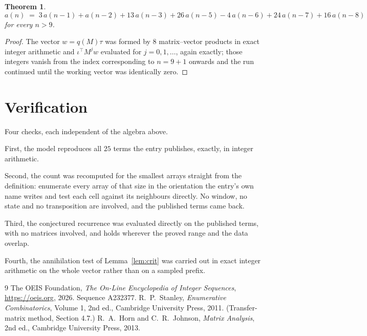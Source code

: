 \documentclass[11pt,a4paper]{article}
\theoremstyle{plain}
\newtheorem{theorem}{Theorem}
\theoremstyle{definition}
\begin{document}
\begin{theorem}
\[
a(n)\;=\;3\,a(n-1) + a(n-2) + 13\,a(n-3) + 26\,a(n-5) - 4\,a(n-6) + 24\,a(n-7) + 16\,a(n-8)
\]
for every $n>9$.
\end{theorem}

\begin{proof}
The vector $w=q(M)\tau$ was formed by $8$ matrix--vector products in exact integer
arithmetic and $\iota^{\!\top}M^{j}w$ evaluated for $j=0,1,\dots$, again exactly; those
integers vanish from the index corresponding to $n=9+1$ onwards and the run continued
until the working vector was identically zero.
\end{proof}

\section{Verification}

Four checks, each independent of the algebra above.

First, the model reproduces all $25$ terms the entry publishes, exactly, in integer
arithmetic.

Second, the count was recomputed for the smallest arrays straight from the definition:
enumerate every array of that size in the orientation the entry's own name writes and test each
cell against its neighbours directly. No window, no state and no transposition are involved,
and the published terms came back.

Third, the conjectured recurrence was evaluated directly on the published terms, with no
matrices involved, and holds wherever the proved range and the data overlap.

Fourth, the annihilation test of Lemma~\ref{lem:crit} was carried out in exact integer
arithmetic on the whole vector rather than on a sampled prefix.

\begin{thebibliography}{9}
 The OEIS Foundation, \emph{The On-Line Encyclopedia of Integer
Sequences}, \url{https://oeis.org}, 2026. Sequence A232377.
 R.~P.~Stanley, \emph{Enumerative Combinatorics}, Volume 1, 2nd ed.,
Cambridge University Press, 2011. (Transfer-matrix method, Section 4.7.)
 R.~A.~Horn and C.~R.~Johnson, \emph{Matrix Analysis}, 2nd ed., Cambridge
University Press, 2013.
\end{thebibliography}
\end{document}
